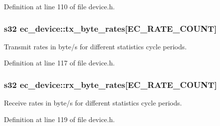 \-Definition at line 110 of file device.\-h.

\subsubsection[{tx\-\_\-byte\-\_\-rates}]{\setlength{\rightskip}{0pt plus 5cm}s32 {\bf ec\-\_\-device\-::tx\-\_\-byte\-\_\-rates}[{\bf \-E\-C\-\_\-\-R\-A\-T\-E\-\_\-\-C\-O\-U\-N\-T}]}\label{structec__device_a5decb734bd07c7e1a1b66e08904f0bba}


\-Transmit rates in byte/s for different statistics cycle periods. 



\-Definition at line 117 of file device.\-h.

\subsubsection[{rx\-\_\-byte\-\_\-rates}]{\setlength{\rightskip}{0pt plus 5cm}s32 {\bf ec\-\_\-device\-::rx\-\_\-byte\-\_\-rates}[{\bf \-E\-C\-\_\-\-R\-A\-T\-E\-\_\-\-C\-O\-U\-N\-T}]}\label{structec__device_a577e0651d974aa3db43fcb8fab639637}


\-Receive rates in byte/s for different statistics cycle periods. 



\-Definition at line 119 of file device.\-h.


